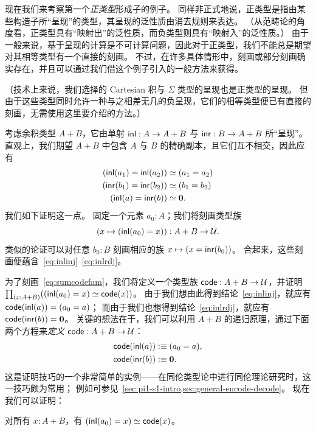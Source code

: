 现在我们来考察第一个\emph{正类型}形成子的例子。
%
同样非正式地说，正类型是指由某些构造子所``呈现''的类型，其呈现的泛性质由消去规则来表达。
（从范畴论的角度看，正类型具有``映射出''的泛性质，而负类型则具有``映射入''的泛性质。）
由于一般来说，基于呈现的计算是不可计算问题，因此对于正类型，我们不能总是期望对其相等类型有一个直接的刻画。
不过，在许多具体情形中，刻画或部分刻画确实存在，并且可以通过我们借这个例子引入的一般方法来获得。

（技术上来说，我们选择的 Cartesian 积与 $\Sigma$ 类型的呈现也是正类型的呈现。
但由于这些类型同时允许一种与之相差无几的负呈现，它们的相等类型便已有直接的刻画，无需使用这里要介绍的方法。）

考虑余积类型 $A+B$，它由单射 ${\mathsf{inl}}:A\to A+B$ 与 ${\mathsf{inr}}:B\to A+B$ 所``呈现''。
直观上，我们期望 $A+B$ 中包含 $A$ 与 $B$ 的精确副本，且它们互不相交，因此应有
\begin{align}
  {(\inl(a_1)=\inl(a_2))}&\eqvsym {(a_1=a_2)} \label{eq:inlinj}\\
  {(\inr(b_1)=\inr(b_2))}&\eqvsym {(b_1=b_2)}\\
  {(\inl(a)= \inr(b))} &\eqvsym {\emptyt}. \label{eq:inlrdj}
\end{align}
我们如下证明这一点。
固定一个元素 $a_0:A$；我们将刻画类型族
\begin{equation}
  (x\mapsto ({\mathsf{inl}}(a_0)=x)) : A+B \to \mathcal{U}.\label{eq:sumcodefam}
\end{equation}
类似的论证可以对任意 $b_0:B$ 刻画相应的族 $x\mapsto (x = {\mathsf{inr}}(b_0))$。
合起来，这些刻画便蕴含~\eqref{eq:inlinj}--\eqref{eq:inlrdj}。

为了刻画~\eqref{eq:sumcodefam}，我们将定义一个类型族 $\mathsf{code}:A+B\to\mathcal{U}$，并证明 $\prd{x:A+B} (\eqv{(\inl(a_0)=x)}{\code(x)})$。
由于我们想由此得到结论~\eqref{eq:inlinj}，就应有 $\mathsf{code}({\mathsf{inl}}(a)) = (a_0=a)$；
而由于我们也想得到结论~\eqref{eq:inlrdj}，就应有 $\mathsf{code} ({\mathsf{inr}}(b)) = \mathbf{0}$。
关键的想法在于，我们可以利用 $A+B$ 的递归原理，通过下面两个方程来\emph{定义} $\mathsf{code}:A+B\to\mathcal{U}$：
\begin{align*}
  \mathsf{code}({\mathsf{inl}}(a)) &\vcentcolon\equiv (a_0=a),\\
  \mathsf{code}({\mathsf{inr}}(b)) &\vcentcolon\equiv \mathbf{0}.
\end{align*}
这是证明技巧的一个非常简单的实例——在同伦类型论中进行同伦理论研究时，这一技巧颇为常用；
例如可参见\ \cref{sec:pi1-s1-intro,sec:general-encode-decode}。
%
现在我们可以证明：

\begin{thm}\label{thm:path-coprod}
  对所有 $x:A+B$，有 $({\mathsf{inl}}(a_0)=x) \simeq \mathsf{code}(x)$。
\end{thm}

